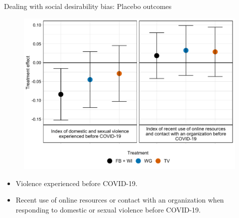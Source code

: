 \documentclass[10pt]{beamer}
\begin{document}
\begin{frame}{Dealing with social desirability bias: Placebo outcomes}
\begin{figure}[H]
    \centering
    \includegraphics[width=.8\textwidth]{Figures/RF-FS/FigureA2.pdf}
\end{figure}
\begin{itemize}
    \item Violence experienced before COVID-19. 
    \item Recent use of online resources or contact with an organization when responding to domestic or sexual violence  before COVID-19.
\end{itemize}
\end{frame}
\end{document}
